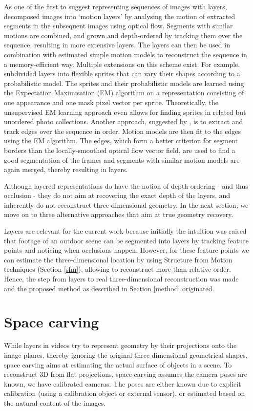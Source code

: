 As one of the first to suggest representing sequences of images with layers,  decomposed images into `motion layers' by analysing the motion of extracted segments in the subsequent images using optical flow. Segments with similar motions are combined, and grown and depth-ordered by tracking them over the sequence, resulting in more extensive layers. The layers can then be used in combination with estimated simple motion models to reconstruct the sequence in a memory-efficient way. Multiple extensions on this scheme exist. For example,  subdivided layers into flexible sprites that can vary their shapes according to a probabilistic model. The sprites and their probabilistic models are learned using the Expectation Maximisation (EM) algorithm on a representation consisting of one appearance and one mask pixel vector per sprite. Theoretically, the unsupervised EM learning approach even allows for finding sprites in related but unordered photo collections. Another approach, suggested by , is to extract and track edges over the sequence in order. Motion models are then fit to the edges using the EM algorithm. The edges, which form a better criterion for segment borders than the locally-smoothed optical flow vector field, are used to find a good segmentation of the frames and segments with similar motion models are again merged, thereby resulting in layers.

Although layered representations do have the notion of depth-ordering - and thus occlusion - they do not aim at recovering the exact depth of the layers, and inherently do not reconstruct three-dimensional geometry. In the next section, we move on to three alternative approaches that aim at true geometry recovery.

Layers are relevant for the current work because initially the intuition was raised that footage of an outdoor scene can be segmented into layers by tracking feature points and noticing when occlusions happen. However, for these feature points we can estimate the three-dimensional location by using Structure from Motion techniques (Section \ref{sfm}), allowing to reconstruct more than relative order. Hence, the step from layers to real three-dimensional reconstruction was made and the proposed method as described in Section \ref{method} originated.


\pagebreak
\section{Space carving}  \label{carving}
While layers in videos try to represent geometry by their projections onto the image planes, thereby ignoring the original three-dimensional geometrical shapes, space carving aims at estimating the actual surface of objects in a scene. To reconstruct 3D from flat projections, space carving assumes the camera poses are known, \ie we have calibrated cameras. The poses are either known due to explicit calibration (using a calibration object or external sensor), or estimated based on the natural content of the images.

